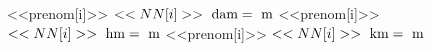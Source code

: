 
<<prenom[i]>> $<<NN[i]>>~\text{dam}=\dotfill~\text{m}$
<<prenom[i]>> $<<NN[i]>>~\text{hm}=\dotfill~\text{m}$
<<prenom[i]>> $<<NN[i]>>~\text{km}=\dotfill~\text{m}$

